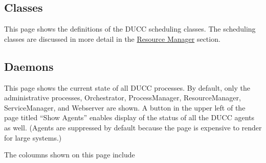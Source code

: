 \subsection{Classes}
This page shows the definitions of the DUCC scheduling classes.  The scheduling classes are
discussed in more detail in the \hyperref[sec:rm.job-classes]{Resource Manager} section.

\subsection{Daemons}

This page shows the current state of all DUCC processes.  By default, only the administrative
processes, Orchestrator, ProcessManager, ResourceManager, ServiceManager, and Webserver are
shown.  A button in the upper left of the page titled ``Show Agents'' enables display of
the status of all the DUCC agents as well. (Agents are suppressed by default because the
page is expensive to render for large systems.)

The coloumns shown on this page include

